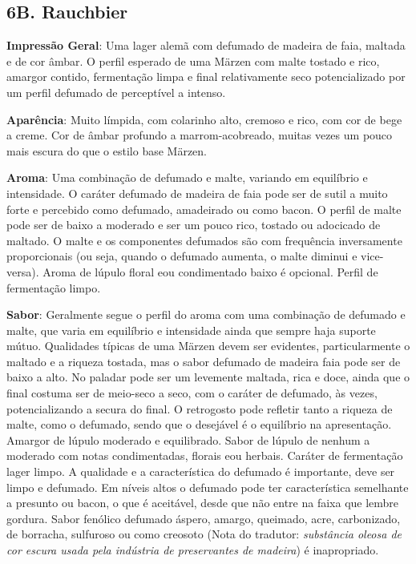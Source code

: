 \subsection*{6B. Rauchbier}

\textbf{Impressão Geral}: Uma lager alemã com defumado de madeira de faia, maltada e de cor âmbar. O perfil esperado de uma Märzen com malte tostado e rico, amargor contido, fermentação limpa e final relativamente seco potencializado por um perfil defumado de perceptível a intenso.

\textbf{Aparência}: Muito límpida, com colarinho alto, cremoso e rico, com cor de bege a creme. Cor de âmbar profundo a marrom-acobreado, muitas vezes um pouco mais escura do que o estilo base Märzen.

\textbf{Aroma}: Uma combinação de defumado e malte, variando em equilíbrio e intensidade. O caráter defumado de madeira de faia pode ser de sutil a muito forte e percebido como defumado, amadeirado ou como bacon. O perfil de malte pode ser de baixo a moderado e ser um pouco rico, tostado ou adocicado de maltado. O malte e os componentes defumados são com frequência inversamente proporcionais (ou seja, quando o defumado aumenta, o malte diminui e vice-versa). Aroma de lúpulo floral e\/ou condimentado baixo é opcional. Perfil de fermentação limpo.

\textbf{Sabor}: Geralmente segue o perfil do aroma com uma combinação de defumado e malte, que varia em equilíbrio e intensidade ainda que sempre haja suporte mútuo. Qualidades típicas de uma Märzen devem ser evidentes, particularmente o maltado e a riqueza tostada, mas o sabor defumado de madeira faia pode ser de baixo a alto. No paladar pode ser um levemente maltada, rica e doce, ainda que o final costuma ser de meio-seco a seco, com o caráter de defumado, às vezes, potencializando a secura do final. O retrogosto pode refletir tanto a riqueza de malte, como o defumado, sendo que o desejável é o equilíbrio na apresentação. Amargor de lúpulo moderado e equilibrado. Sabor de lúpulo de nenhum a moderado com notas condimentadas, florais e\/ou herbais. Caráter de fermentação lager limpo. A qualidade e a característica do defumado é importante, deve ser limpo e defumado. Em níveis altos o defumado pode ter característica semelhante a presunto ou bacon, o que é aceitável, desde que não entre na faixa que lembre gordura. Sabor fenólico defumado áspero, amargo, queimado, acre, carbonizado, de borracha, sulfuroso ou como creosoto (Nota do tradutor: \textit{substância oleosa de cor escura usada pela indústria de preservantes de madeira}) é inapropriado.

